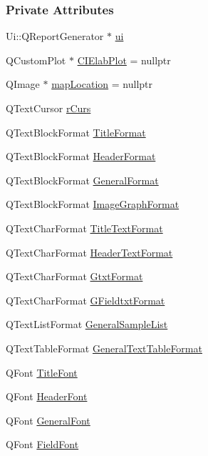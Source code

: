 \subsubsection*{Private Attributes}
\begin{DoxyCompactItemize}
\item 
Ui\+::\+Q\+Report\+Generator $\ast$ \hyperlink{class_q_report_generator_a4584dd4f053586b84b4a9f883a3313d9}{ui}
\item 
Q\+Custom\+Plot $\ast$ \hyperlink{class_q_report_generator_a1a727308ea8cb98523a308d10da70b39}{C\+I\+Elab\+Plot} = nullptr
\item 
Q\+Image $\ast$ \hyperlink{class_q_report_generator_a1369081e13fce26f60a10eb846551515}{map\+Location} = nullptr
\item 
Q\+Text\+Cursor \hyperlink{class_q_report_generator_af189d3779d26af513e311eea89a78a28}{r\+Curs}
\item 
Q\+Text\+Block\+Format \hyperlink{class_q_report_generator_a1c6eac3b9c26e7fb32de033879ae6e6e}{Title\+Format}
\item 
Q\+Text\+Block\+Format \hyperlink{class_q_report_generator_af2b45261507663b54e80f4053d25bc4b}{Header\+Format}
\item 
Q\+Text\+Block\+Format \hyperlink{class_q_report_generator_a9a18bc94ca92a730ae0f13d60a6b5e0a}{General\+Format}
\item 
Q\+Text\+Block\+Format \hyperlink{class_q_report_generator_a19451127788bb6c68907b312a0a8b750}{Image\+Graph\+Format}
\item 
Q\+Text\+Char\+Format \hyperlink{class_q_report_generator_a7eebc837740d933bf4767e584f1d486c}{Title\+Text\+Format}
\item 
Q\+Text\+Char\+Format \hyperlink{class_q_report_generator_a8be687c8a427e341fa1c7f9addc96e99}{Header\+Text\+Format}
\item 
Q\+Text\+Char\+Format \hyperlink{class_q_report_generator_ad78e127d228dd0c11c438d4681a20379}{Gtxt\+Format}
\item 
Q\+Text\+Char\+Format \hyperlink{class_q_report_generator_afa9431684b9e2612f1d508f7e837aec5}{G\+Fieldtxt\+Format}
\item 
Q\+Text\+List\+Format \hyperlink{class_q_report_generator_a415a4b3a8995d02b724156b5e9c14486}{General\+Sample\+List}
\item 
Q\+Text\+Table\+Format \hyperlink{class_q_report_generator_afcb27e52bd15a286a1933c3b9cf01c92}{General\+Text\+Table\+Format}
\item 
Q\+Font \hyperlink{class_q_report_generator_a6ec92ac9d2ef36345c1f6089629c13a7}{Title\+Font}
\item 
Q\+Font \hyperlink{class_q_report_generator_ad23921b0c8d0e77db7cfc0b611d9e93c}{Header\+Font}
\item 
Q\+Font \hyperlink{class_q_report_generator_ab7022962a87365f93a5e168d946ebd85}{General\+Font}
\item 
Q\+Font \hyperlink{class_q_report_generator_ae23241660848e9015b6d3bf814d1b381}{Field\+Font}
\end{DoxyCompactItemize}


